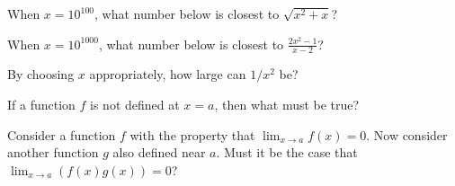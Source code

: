 \documentclass{ximera}
\newcommand{\recommendation}[1]{}
\newcommand{\GoodQuestions}[1]{}
\begin{document}


\begin{problem}
  When $x = 10^{100}$, what number below is closest to $\sqrt{x^2 + x}$?
  \begin{multipleChoice}
  \end{multipleChoice}
\end{problem}

\begin{problem}
  When $x = 10^{1000}$, what number below is closest to $\frac{2x^2 - 1}{x-2}$? %
  \begin{multipleChoice}
  \end{multipleChoice}
\end{problem}

\begin{problem}
  By choosing $x$ appropriately, how large can $1/x^2$ be?
  \begin{multipleChoice}
  \end{multipleChoice}
\end{problem}

\begin{problem}
  \recommendation{Vic}
  \GoodQuestions{Subject: Limits, 11Q}
  If a function $f$ is not defined at $x=a$, then what must be true?
  \begin{multipleChoice}
  \end{multipleChoice} 
\end{problem}

\begin{problem}
  \recommendation{Vic}
  \GoodQuestions{Subject: Limits 16Q}
  Consider a function $f$ with the property that
  $\lim_{x\to a} f(x) =0$.  Now consider another function $g$ also
  defined near $a$.  Must it be the case that
  $\lim_{x\to a} \left(f(x)g(x)\right) = 0$?
  \begin{multipleChoice}
  \end{multipleChoice}
\end{problem}
\end{document}
